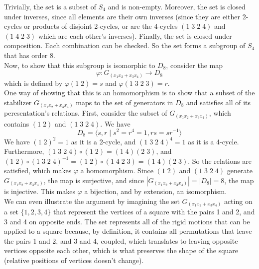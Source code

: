 \documentclass[12pt]{article}
\begin{document}
\begin{enumerate}[label=\textbf{\alph*.}]
            Trivially, the set is a subset of $S_4$ and is non-empty.
            Moreover, the set is closed under inverses,
            since all elements are their own inverses (since they
            are either 2-cycles or products of disjoint 2-cycles,
            or are the 4-cycles $(1\;3\;2\;4)$ and $(1\;4\;2\;3)$
            which are each other's inverses).
            Finally, the set is closed under composition.
            Each combination can be checked.
            So the set forms a subgroup of $S_4$ that has order 8. \\
            Now, to show that this subgroup is isomorphic to $D_8$,
            consider the map
            \[ \varphi: G_{(x_1x_2 + x_3x_4)} \to D_8 \]
            which is defined by $\varphi(1\;2) = s$
            and $\varphi(1\;3\;2\;3) = r$. \\
            One way of showing that this is an homomorphism is
            to show that a subset of the stabilizer $G_{(x_1x_2 + x_3x_4)}$
            maps to the set of generators in $D_8$ and satisfies
            all of its peresentation's relations.
            First, consider the subset of $G_{(x_1x_2 + x_3x_4)}$,
            which contains $(1\;2)$ and $(1\;3\;2\;4)$.
            We have
            \[ D_8 = \langle s, r \mid s^2 = r^4 = 1, rs = sr^{-1} \rangle \]
            We have $(1\;2)^2 = 1$ as it is a 2-cycle,
            and $(1\;3\;2\;4)^4 = 1$ as it is a 4-cycle. \\
            Furthermore, $(1\;3\;2\;4) \circ (1\;2) = (1\;4)(2\;3)$,
            and $(1\;2) \circ (1\;3\;2\;4)^{-1}
            = (1\;2) \circ (1\;4\;2\;3)
            = (1\;4)(2\;3)$.
            So the relations are satisfied,
            which makes $\varphi$ a homomorphism.
            Since $(1\;2)$ and $(1\;3\;2\;4)$ generate $G_{(x_1x_2 + x_3x_4)}$,
            the map is surjective,
            and since $|G_{(x_1x_2 + x_3x_4)}| = |D_8| = 8$,
            the map is injective.
            This makes $\varphi$ a bijection,
            and by extension, an isomorphism. \\
            We can even illustrate the argument by imagining
            the set $G_{(x_1x_2 + x_3x_4)}$ acting on a set $\{1, 2, 3, 4\}$
            that represent the vertices of a square
            with the pairs 1 and 2, and 3 and 4 on opposite ends.
            The set represents all of the rigid motions that can be applied
            to a square because, by definition,
            it contains all permutations that leave the pairs 
            1 and 2, and 3 and 4, coupled,
            which translates to leaving opposite vertices oppsoite each other,
            which is what preserves the shape of the square
            (relative positions of vertices doesn't change).


\end{enumerate}
\end{document}
